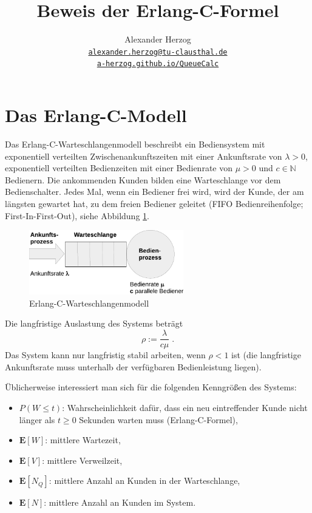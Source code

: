 \documentclass[a4paper,11pt,oneside]{article}
\theoremstyle{definition}
\begin{document}
\title{Beweis der Erlang-C-Formel}
\author{Alexander Herzog\\\href{mailto:alexander.herzog@tu-clausthal.de}{\small\texttt{alexander.herzog@tu-clausthal.de}}\\\href{https://a-herzog.github.io/QueueCalc/}{\small\texttt{a-herzog.github.io/QueueCalc}}}
\date{}

\maketitle



\section{Das Erlang-C-Modell}

Das Erlang-C-Warteschlangenmodell beschreibt ein Bediensystem mit exponentiell verteilten Zwischenankunftszeiten mit einer Ankunftsrate von $\lambda>0$, exponentiell verteilten Bedienzeiten mit einer Bedienrate von $\mu>0$ und $c\in\mathbb{N}$ Bedienern. Die ankommenden Kunden bilden eine Warteschlange vor dem Bedienschalter. Jedes Mal, wenn ein Bediener frei wird, wird der Kunde, der am längsten gewartet hat, zu dem freien Bediener geleitet (FIFO Bedienreihenfolge; First-In-First-Out), siehe Abbildung \ref{fig:Model}.

\begin{figure}[H]
\begin{center}
\includegraphics[width=0.6\textwidth]{ProofOfTheErlangCFormula-Modell.pdf}
\end{center}
\caption{Erlang-C-Warteschlangenmodell}
\label{fig:Model}
\end{figure}

Die langfristige Auslastung des Systems beträgt
$$
\rho:=\frac{\lambda}{c\mu}\;.
$$
Das System kann nur langfristig stabil arbeiten, wenn $\rho<1$ ist (die langfristige Ankunftsrate muss unterhalb der verfügbaren Bedienleistung liegen).


Üblicherweise interessiert man sich für die folgenden Kenngrößen des Systems:
\begin{itemize}
\item
$P(W\le t)$: Wahrscheinlichkeit dafür, dass ein neu eintreffender Kunde nicht länger als $t\ge0$ Sekunden warten muss (Erlang-C-Formel),
\item
$\mathbf{E}[W]$: mittlere Wartezeit,
\item
$\mathbf{E}[V]$: mittlere Verweilzeit,
\item
$\mathbf{E}[N_Q]$: mittlere Anzahl an Kunden in der Warteschlange,
\item
$\mathbf{E}[N]$: mittlere Anzahl an Kunden im System.
\end{itemize}
\end{document}
